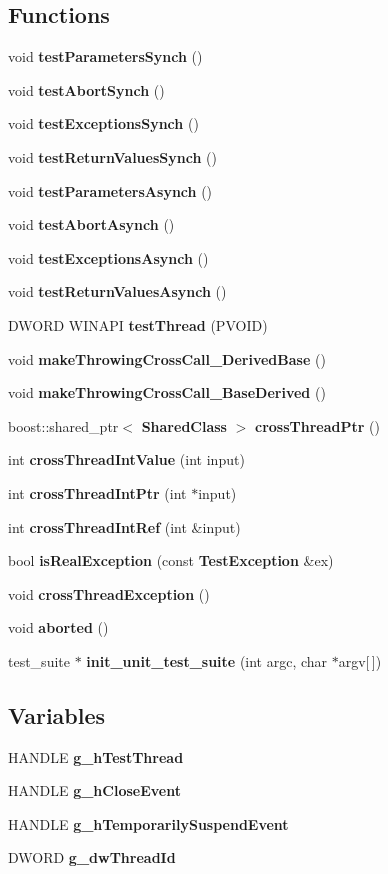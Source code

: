 \subsection*{Functions}
\begin{CompactItemize}
\item 
void {\bf test\-Parameters\-Synch} ()
\item 
void {\bf test\-Abort\-Synch} ()
\item 
void {\bf test\-Exceptions\-Synch} ()
\item 
void {\bf test\-Return\-Values\-Synch} ()
\item 
void {\bf test\-Parameters\-Asynch} ()
\item 
void {\bf test\-Abort\-Asynch} ()
\item 
void {\bf test\-Exceptions\-Asynch} ()
\item 
void {\bf test\-Return\-Values\-Asynch} ()
\item 
DWORD WINAPI {\bf test\-Thread} (PVOID)
\item 
void {\bf make\-Throwing\-Cross\-Call\_\-Derived\-Base} ()
\item 
void {\bf make\-Throwing\-Cross\-Call\_\-Base\-Derived} ()
\item 
boost::shared\_\-ptr$<$ {\bf Shared\-Class} $>$ {\bf cross\-Thread\-Ptr} ()
\item 
int {\bf cross\-Thread\-Int\-Value} (int input)
\item 
int {\bf cross\-Thread\-Int\-Ptr} (int $\ast$input)
\item 
int {\bf cross\-Thread\-Int\-Ref} (int \&input)
\item 
bool {\bf is\-Real\-Exception} (const {\bf Test\-Exception} \&ex)
\item 
void {\bf cross\-Thread\-Exception} ()
\item 
void {\bf aborted} ()
\item 
test\_\-suite $\ast$ {\bf init\_\-unit\_\-test\_\-suite} (int argc, char $\ast$argv[$\,$])
\end{CompactItemize}
\subsection*{Variables}
\begin{CompactItemize}
\item 
HANDLE {\bf g\_\-h\-Test\-Thread}
\item 
HANDLE {\bf g\_\-h\-Close\-Event}
\item 
HANDLE {\bf g\_\-h\-Temporarily\-Suspend\-Event}
\item 
DWORD {\bf g\_\-dw\-Thread\-Id}
\end{CompactItemize}


